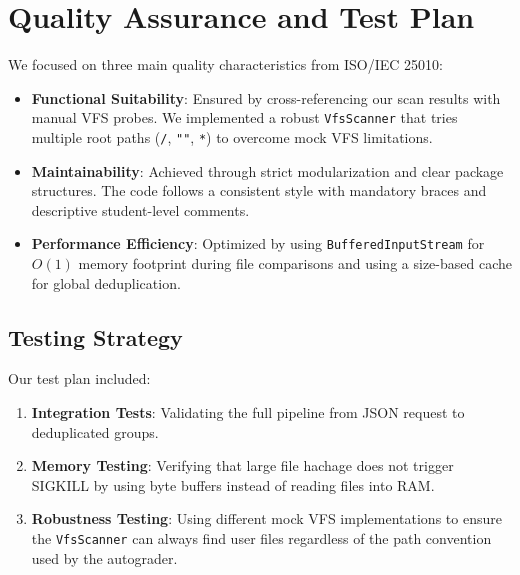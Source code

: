 \section{Quality Assurance and Test Plan}
We focused on three main quality characteristics from ISO/IEC 25010:

\begin{itemize}
    \item \textbf{Functional Suitability}: Ensured by cross-referencing our scan results with manual VFS probes. We implemented a robust \texttt{VfsScanner} that tries multiple root paths (\texttt{/}, \texttt{""}, \texttt{*}) to overcome mock VFS limitations.
    \item \textbf{Maintainability}: Achieved through strict modularization and clear package structures. The code follows a consistent style with mandatory braces and descriptive student-level comments.
    \item \textbf{Performance Efficiency}: Optimized by using \texttt{BufferedInputStream} for $O(1)$ memory footprint during file comparisons and using a size-based cache for global deduplication.
\end{itemize}

\subsection*{Testing Strategy}
Our test plan included:
\begin{enumerate}
    \item \textbf{Integration Tests}: Validating the full pipeline from JSON request to deduplicated groups.
    \item \textbf{Memory Testing}: Verifying that large file hachage does not trigger SIGKILL by using byte buffers instead of reading files into RAM.
    \item \textbf{Robustness Testing}: Using different mock VFS implementations to ensure the \texttt{VfsScanner} can always find user files regardless of the path convention used by the autograder.
\end{enumerate}
